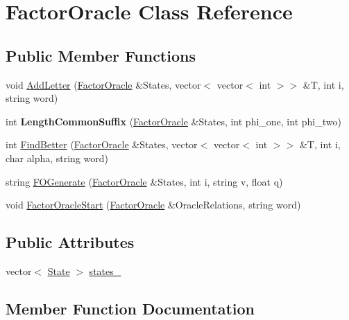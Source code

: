 \hypertarget{class_factor_oracle}{}\section{Factor\+Oracle Class Reference}
\label{class_factor_oracle}
\subsection*{Public Member Functions}
\begin{DoxyCompactItemize}
\item 
void \mbox{\hyperlink{class_factor_oracle_ae10b4d001c338a73f0f44079e842e7db}{Add\+Letter}} (\mbox{\hyperlink{class_factor_oracle}{Factor\+Oracle}} \&States, vector$<$ vector$<$ int $>$$>$ \&T, int i, string word)
\item 
\mbox{\label{class_factor_oracle_a9511ac49e53ccf3a1907db4591e1ad0b}} 
int {\bfseries Length\+Common\+Suffix} (\mbox{\hyperlink{class_factor_oracle}{Factor\+Oracle}} \&States, int phi\+\_\+one, int phi\+\_\+two)
\item 
int \mbox{\hyperlink{class_factor_oracle_a28d2e85676712f983b1dcba83ae07d50}{Find\+Better}} (\mbox{\hyperlink{class_factor_oracle}{Factor\+Oracle}} \&States, vector$<$ vector$<$ int $>$$>$ \&T, int i, char alpha, string word)
\item 
string \mbox{\hyperlink{class_factor_oracle_abe8c4c194b309aeeff1bc05c25563390}{F\+O\+Generate}} (\mbox{\hyperlink{class_factor_oracle}{Factor\+Oracle}} \&States, int i, string v, float q)
\item 
void \mbox{\hyperlink{class_factor_oracle_a070d7b00cfcb658c5d13ff275ceae01f}{Factor\+Oracle\+Start}} (\mbox{\hyperlink{class_factor_oracle}{Factor\+Oracle}} \&Oracle\+Relations, string word)
\end{DoxyCompactItemize}
\subsection*{Public Attributes}
\begin{DoxyCompactItemize}
\item 
vector$<$ \mbox{\hyperlink{class_state}{State}} $>$ \mbox{\hyperlink{class_factor_oracle_a6e8dacf834f9ee820818c3655d77d56d}{states\+\_\+}}
\end{DoxyCompactItemize}


\subsection{Member Function Documentation}
\mbox{\label{class_factor_oracle_ae10b4d001c338a73f0f44079e842e7db}} 
